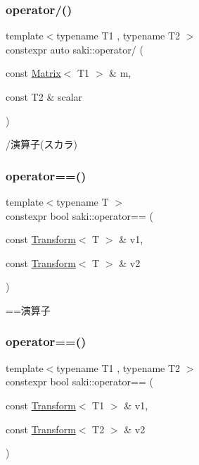 \subsubsection{\texorpdfstring{operator/()}{operator/()}\hspace{0.1cm}{\footnotesize\ttfamily [8/8]}}
{\footnotesize\ttfamily template$<$typename T1 , typename T2 $>$ \\
constexpr auto saki\+::operator/ (\begin{DoxyParamCaption}\item[{const \mbox{\hyperlink{classsaki_1_1_matrix}{Matrix}}$<$ T1 $>$ \&}]{m,  }\item[{const T2 \&}]{scalar }\end{DoxyParamCaption})}



/演算子(スカラ) 

\mbox{\label{namespacesaki_a547efe3eda4f6c4f41c5bda2676a8c0a}} 
\subsubsection{\texorpdfstring{operator==()}{operator==()}\hspace{0.1cm}{\footnotesize\ttfamily [1/10]}}
{\footnotesize\ttfamily template$<$typename T $>$ \\
constexpr bool saki\+::operator== (\begin{DoxyParamCaption}\item[{const \mbox{\hyperlink{classsaki_1_1_transform}{Transform}}$<$ T $>$ \&}]{v1,  }\item[{const \mbox{\hyperlink{classsaki_1_1_transform}{Transform}}$<$ T $>$ \&}]{v2 }\end{DoxyParamCaption})}



==演算子 

\mbox{\label{namespacesaki_a55c0ab8cb5196de1f32bf7bbe49591f0}} 
\subsubsection{\texorpdfstring{operator==()}{operator==()}\hspace{0.1cm}{\footnotesize\ttfamily [2/10]}}
{\footnotesize\ttfamily template$<$typename T1 , typename T2 $>$ \\
constexpr bool saki\+::operator== (\begin{DoxyParamCaption}\item[{const \mbox{\hyperlink{classsaki_1_1_transform}{Transform}}$<$ T1 $>$ \&}]{v1,  }\item[{const \mbox{\hyperlink{classsaki_1_1_transform}{Transform}}$<$ T2 $>$ \&}]{v2 }\end{DoxyParamCaption})}



